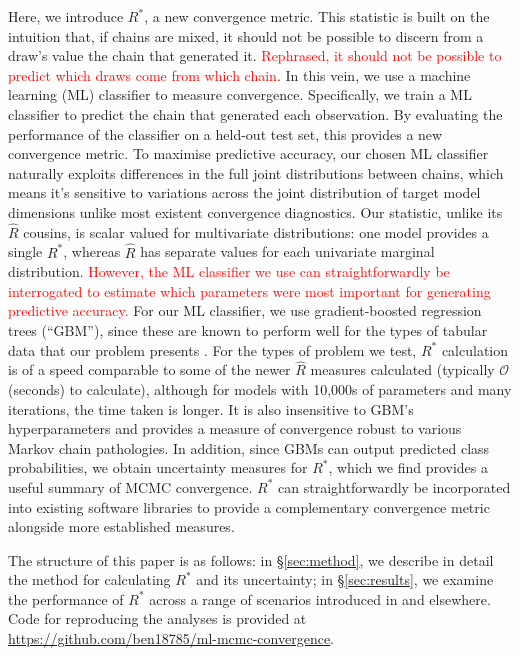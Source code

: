 \documentclass{article}
\begin{document}
Here, we introduce $R^*$, a new convergence metric. This statistic is built on the intuition that, if chains are mixed, it should not be possible to discern from a draw's value the chain that generated it. \textcolor{red}{Rephrased, it should not be possible to predict which draws come from which chain}. In this vein, we use a machine learning (ML) classifier to measure convergence. Specifically, we train a ML classifier to predict the chain that generated each observation. By evaluating the performance of the classifier on a held-out test set, this provides a new convergence metric. To maximise predictive accuracy, our chosen ML classifier naturally exploits differences in the full joint distributions between chains, which means it's sensitive to variations across the joint distribution of target model dimensions unlike most existent convergence diagnostics. Our statistic, unlike its $\widehat{R}$ cousins, is scalar valued for multivariate distributions: one model provides a single $R^*$, whereas $\widehat{R}$ has separate values for each univariate marginal distribution. \textcolor{red}{However, the ML classifier we use can straightforwardly be interrogated to estimate which parameters were most important for generating predictive accuracy.} For our ML classifier, we use gradient-boosted regression trees \citep{friedman2001greedy,greenwell2019package} (``GBM''), since these are known to perform well for the types of tabular data that our problem presents \citep{chollet2018}. For the types of problem we test, $R^*$ calculation is of a speed comparable to some of the newer $\widehat{R}$ measures calculated (typically $\mathcal{O}$(seconds) to calculate), although for models with 10,000s of parameters and many iterations, the time taken is longer. It is also insensitive to GBM's hyperparameters and provides a measure of convergence robust to various Markov chain pathologies. In addition, since GBMs can output predicted class probabilities, we obtain uncertainty measures for $R^*$, which we find provides a useful summary of MCMC convergence. $R^*$ can straightforwardly be incorporated into existing software libraries to provide a complementary convergence metric alongside more established measures.

The structure of this paper is as follows: in \S\ref{sec:method}, we describe in detail the method for calculating $R^*$ and its uncertainty; in \S\ref{sec:results}, we examine the performance of $R^*$ across a range of scenarios introduced in \cite{vehtari2019rank} and elsewhere. Code for reproducing the analyses is provided at \url{https://github.com/ben18785/ml-mcmc-convergence}.
\end{document}

